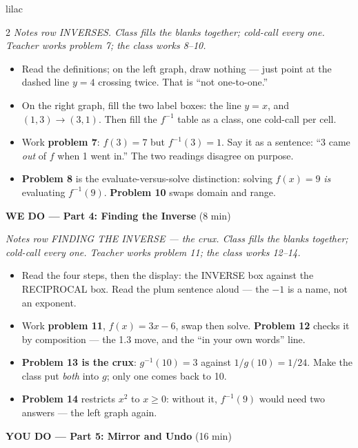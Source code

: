 \documentclass[10pt]{article}
\begin{document}
\begin{skillbox}{lilac}
\begin{multicols}{2}
\textit{Notes row INVERSES. Class fills the blanks together; cold-call every one. Teacher
works problem 7; the class works 8--10.}
\begin{itemize}
  \item Read the definitions; on the left graph, draw nothing --- just point at the dashed
        line $y = 4$ crossing twice. That is ``not one-to-one.''
  \item On the right graph, fill the two label boxes: the line $y = x$, and $(1, 3) \to
        (3, 1)$. Then fill the $f^{-1}$ table as a class, one cold-call per cell.
  \item Work \textbf{problem 7}: $f(3) = 7$ but $f^{-1}(3) = 1$. Say it as a sentence: ``3
        came \textit{out} of $f$ when 1 went in.'' The two readings disagree on purpose.
  \item \textbf{Problem 8} is the evaluate-versus-solve distinction: solving $f(x) = 9$
        \textit{is} evaluating $f^{-1}(9)$. \textbf{Problem 10} swaps domain and range.
\end{itemize}

\textbf{WE DO --- Part 4: Finding the Inverse} (8 min)

\textit{Notes row FINDING THE INVERSE --- the crux. Class fills the blanks together; cold-call
every one. Teacher works problem 11; the class works 12--14.}
\begin{itemize}
  \item Read the four steps, then the display: the INVERSE box against the RECIPROCAL box.
        Read the plum sentence aloud --- the $-1$ is a name, not an exponent.
  \item Work \textbf{problem 11}, $f(x) = 3x - 6$, swap then solve. \textbf{Problem 12}
        checks it by composition --- the 1.3 move, and the ``in your own words'' line.
  \item \textbf{Problem 13 is the crux}: $g^{-1}(10) = 3$ against $1/g(10) = 1/24$. Make the
        class put \textit{both} into $g$; only one comes back to 10.
  \item \textbf{Problem 14} restricts $x^2$ to $x \ge 0$: without it, $f^{-1}(9)$ would need
        two answers --- the left graph again.
\end{itemize}

\textbf{YOU DO --- Part 5: Mirror and Undo} (16 min)


\end{multicols}
\end{skillbox}
\end{document}
